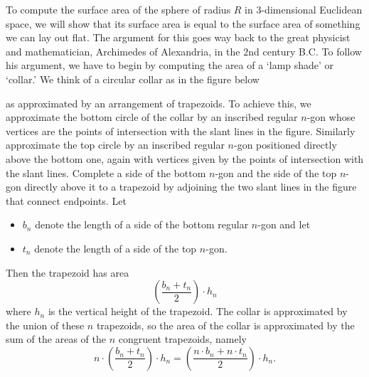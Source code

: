 \documentclass[newpage,hints,handout]{ximera}
\begin{document}
To compute the surface area of the sphere of radius $R$ in $3$-dimensional
Euclidean space, we will show that its surface area is equal to the surface
area of something we can lay out flat. The argument for this goes way back to
the great physicist and mathematician, Archimedes of Alexandria, in the $2$nd
century B.C. To follow his argument, we have to begin by computing the area of
a `lamp shade' or `collar.' We think of a circular collar as in the figure
below%
\begin{image}
\end{image}
as approximated by an arrangement of trapezoids. To achieve this, we
approximate the bottom circle of the collar by an inscribed regular $n$-gon
whose vertices are the points of intersection with the slant lines in the
figure. Similarly approximate the top circle by an inscribed regular $n$-gon
positioned directly above the bottom one, again with vertices given by the
points of intersection with the slant lines. Complete a side of the bottom
$n$-gon and the side of the top $n$-gon directly above it to a trapezoid by
adjoining the two slant lines in the figure that connect endpoints. Let
\begin{itemize}
\item $b_{n}$ denote the length of a side of the bottom regular
  $n$-gon and let 
\item $t_{n}$ denote the length of a side of the top $n$-gon. 
\end{itemize}
Then the trapezoid has area
\[
\left(  \frac{b_{n}+t_{n}}{2}\right)  \cdot h_{n}%
\]
where $h_{n}$ is the vertical height of the trapezoid. The collar is
approximated by the union of these $n$ trapezoids, so the area of the collar
is approximated by the sum of the areas of the $n$ congruent trapezoids,
namely%
\[
n\cdot \left(  \frac{b_{n}+t_{n}}{2}\right)
\cdot h_{n}=\left(  \frac{n\cdot %
b_{n}+n\cdot t_{n}}{2}\right) \cdot h_{n}.
\]
\end{document}
